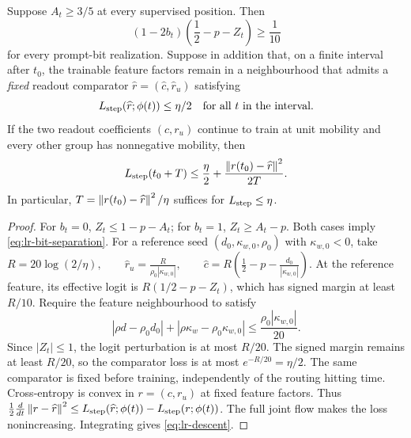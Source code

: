 \begin{lrlemma}
\label{lem:lr-readout-convergence}
Suppose $A_t\ge3/5$ at every supervised position.  Then
\begin{equation}\label{eq:lr-bit-separation}
 (1-2b_t)\left(\frac12-p-Z_t\right)\ge\frac1{10}
\end{equation}
for every prompt-bit realization.  Suppose in addition that, on a
finite interval after $t_0$, the trainable feature factors remain in a
neighbourhood that admits a \emph{fixed} readout comparator
$\widehat r=(\widehat c,\widehat r_u)$ satisfying
\begin{equation}\label{eq:lr-comparator}
 L_{\mathrm{step}}(\widehat r;\phi(t))\le\eta/2
 \quad\text{for all }t\text{ in the interval}.
\end{equation}
If the two readout coefficients $(c,r_u)$ continue to train at unit
mobility and every other group has nonnegative mobility, then
\begin{equation}\label{eq:lr-descent}
 L_{\mathrm{step}}(t_0+T)\le\frac\eta2+
 \frac{\left\lVert r(t_0)-\widehat r\right\rVert^2}{2T}.
\end{equation}
In particular, $T=\left\lVert r(t_0)-\widehat r\right\rVert^2/\eta$ suffices for
$L_{\mathrm{step}}\le\eta$.
\end{lrlemma}
\begin{proof}
For $b_t=0$, $Z_t\le1-p-A_t$; for $b_t=1$,
$Z_t\ge A_t-p$.  Both cases imply
\eqref{eq:lr-bit-separation}.
For a reference seed $(d_0,\kappa_{w,0},\rho_0)$ with $\kappa_{w,0}<0$, take
 $R=20\log(2/\eta),\qquad \widehat r_u=\frac{R}{\rho_0|\kappa_{w,0}|},\qquad \widehat c=R\left(\frac12-p-\frac{d_0}{|\kappa_{w,0}|}\right).$ 
At the reference feature, its effective logit is
$R(1/2-p-Z_t)$, which has signed margin at least $R/10$.
Require the feature neighbourhood to satisfy
\begin{equation}\label{eq:lr-comparator-stability}
 |\rho d-\rho_0d_0|+|\rho \kappa_w-\rho_0\kappa_{w,0}|
 \le\frac{\rho_0|\kappa_{w,0}|}{20}.
\end{equation}
Since $|Z_t|\le1$, the logit perturbation is at most $R/20$.
The signed margin remains at least $R/20$, so the comparator loss is
at most $e^{-R/20}=\eta/2$. The same comparator is fixed before training,
independently of the routing hitting time.
Cross-entropy is convex in $r=(c,r_u)$ at fixed feature factors.  Thus
$\frac12\frac{d}{dt}\left\lVert r-\widehat r\right\rVert^2
\le L_{\mathrm{step}}(\widehat r;\phi(t))-L_{\mathrm{step}}(r;\phi(t))$.
The full joint flow makes the loss nonincreasing.  Integrating gives
\eqref{eq:lr-descent}.
\end{proof}

